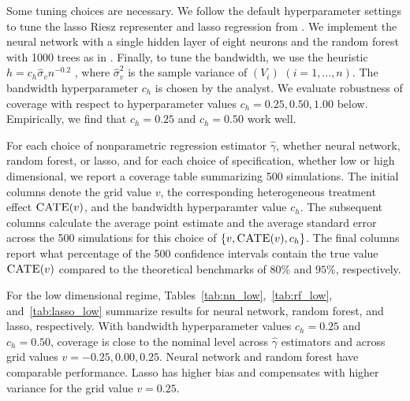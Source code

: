 Some tuning choices are necessary. We follow the default hyperparameter settings to tune the lasso Riesz representer and lasso regression from \cite{chernozhukov2018learning}. We implement the neural network with a single hidden layer of eight neurons and the random forest with 1000 trees as in \cite{chernozhukov2018original}.  Finally, to tune the bandwidth, we use the heuristic $h=c_h\hat{\sigma}_vn^{-0.2}$ \cite{colangelo2020double}, where $\hat{\sigma}^2_v$ is the sample variance of $(V_i)$ $(i=1,...,n)$. The bandwidth hyperparameter $c_h$ is chosen by the analyst. We evaluate robustness of coverage with respect to hyperparameter values $c_h=0.25, 0.50, 1.00$ below. Empirically, we find that $c_h=0.25$ and $c_h=0.50$ work well.

For each choice of nonparametric regression estimator $\hat{\gamma}$, whether neural network, random forest, or lasso, and for each choice of specification, whether low or high dimensional, we report a coverage table summarizing 500 simulations. The initial columns denote the grid value $v$, the corresponding heterogeneous treatment effect $\textsc{CATE}(v)$, and the bandwidth hyperparamter value $c_h$. The subsequent columns calculate the average point estimate and the average standard error across the 500 simulations for this choice of $\{v,\textsc{CATE}(v),c_h\}$. The final columns report what percentage of the 500 confidence intervals contain the true value $\textsc{CATE}(v)$ compared to the theoretical benchmarks of $80\%$ and $95\%$, respectively.

For the low dimensional regime, Tables~\ref{tab:nn_low},~\ref{tab:rf_low}, and~\ref{tab:lasso_low} summarize results for neural network, random forest, and lasso, respectively. With bandwidth hyperparameter values $c_h=0.25$ and $c_h=0.50$, coverage is close to the nominal level across $\hat{\gamma}$ estimators and across grid values $v=-0.25, 0.00, 0.25$. Neural network and random forest have comparable performance. Lasso has higher bias and compensates with higher variance for the grid value $v=0.25$.

